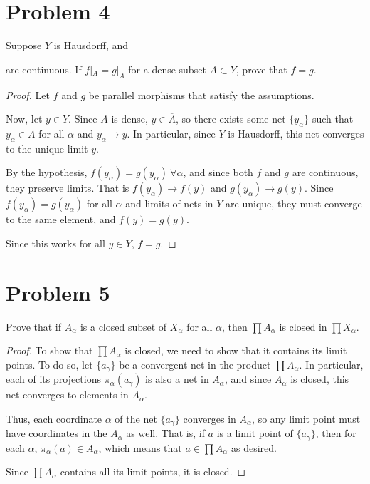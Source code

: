 \documentclass[fontsize=11pt]{scrartcl} %
\numberwithin{equation}{section} %
\numberwithin{figure}{section} %
\numberwithin{table}{section} %
\begin{document}
\section*{Problem 4}
Suppose $Y$ is Hausdorff, and
are continuous. If $f|_A = g|_A$ for a dense subset $A\subset Y$, prove that
$f=g$.
\\
\begin{proof}
Let $f$ and $g$ be parallel morphisms that satisfy the assumptions.

Now, let $y\in Y$. Since $A$ is dense, $y\in\overline{A}$, so there exists some
net $\{y_{\alpha}\}$ such that $y_{\alpha}\in A$ for all $\alpha$ and $y_{\alpha}\to y$.
In particular, since $Y$ is Hausdorff, this net converges to the unique limit $y$.

By the hypothesis, $f(y_{\alpha}) = g(y_{\alpha})\ \forall\alpha$, and since both $f$
and $g$ are continuous, they preserve limits. That is $f(y_{\alpha})\to f(y)$ and
$g(y_{\alpha})\to g(y)$. Since $f(y_{\alpha}) = g(y_{\alpha})$ for all $\alpha$ and 
limits of nets in $Y$ are unique, they must converge to the same element, and $f(y)=g(y)$.

Since this works for all $y\in Y$, $f=g$.
\end{proof}

\section*{Problem 5}
Prove that if $A_{\alpha}$ is a closed subset of $X_{\alpha}$ for all $\alpha$, then
$\prod A_{\alpha}$ is closed in $\prod X_{\alpha}$.
\\
\begin{proof}
To show that $\prod A_{\alpha}$ is closed, we need to show that it contains its limit points.
To do so, let $\{a_{\gamma}\}$ be a convergent net in the product $\prod A_{\alpha}$. In
particular, each of its projections $\pi_{\alpha}(a_\gamma)$ is also a net in $A_{\alpha}$,
and since $A_{\alpha}$ is closed, this net converges to elements in $A_{\alpha}$.

Thus, each coordinate $\alpha$ of the net $\{a_{\gamma}\}$ converges in $A_{\alpha}$, so
any limit point must have coordinates in the $A_{\alpha}$ as well. That is, if $a$ is a
limit point of $\{a_{\gamma}\}$, then for each $\alpha$, $\pi_{\alpha}(a)\in A_{\alpha}$,
which means that $a\in\prod A_{\alpha}$ as desired.

Since $\prod A_{\alpha}$ contains all its limit points, it is closed.
\end{proof}
\end{document}
